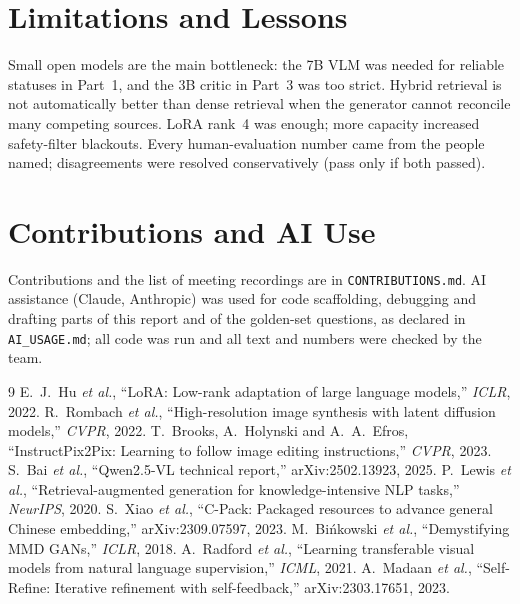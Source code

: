 \documentclass[10pt,twocolumn,letterpaper]{article}
\begin{document}
\section{Limitations and Lessons}
Small open models are the main bottleneck: the 7B VLM was needed for reliable statuses in Part~1, and the 3B critic in
Part~3 was too strict. Hybrid retrieval is not automatically better than dense retrieval when the generator cannot
reconcile many competing sources. LoRA rank~4 was enough; more capacity increased safety-filter blackouts. Every
human-evaluation number came from the people named; disagreements were resolved conservatively (pass only if both
passed).

\pagebreak[2]\section{Contributions and AI Use}
Contributions and the list of meeting recordings are in \texttt{CONTRIBUTIONS.md}. AI assistance (Claude, Anthropic) was
used for code scaffolding, debugging and drafting parts of this report and of the golden-set questions, as declared in
\texttt{AI\_USAGE.md}; all code was run and all text and numbers were checked by the team.

\footnotesize
\begin{thebibliography}{9}
 E.~J.~Hu \emph{et al.}, ``LoRA: Low-rank adaptation of large language models,'' \emph{ICLR}, 2022.
 R.~Rombach \emph{et al.}, ``High-resolution image synthesis with latent diffusion models,'' \emph{CVPR}, 2022.
 T.~Brooks, A.~Holynski and A.~A.~Efros, ``InstructPix2Pix: Learning to follow image editing instructions,'' \emph{CVPR}, 2023.
 S.~Bai \emph{et al.}, ``Qwen2.5-VL technical report,'' arXiv:2502.13923, 2025.
 P.~Lewis \emph{et al.}, ``Retrieval-augmented generation for knowledge-intensive NLP tasks,'' \emph{NeurIPS}, 2020.
 S.~Xiao \emph{et al.}, ``C-Pack: Packaged resources to advance general Chinese embedding,'' arXiv:2309.07597, 2023.
 M.~Bi\'nkowski \emph{et al.}, ``Demystifying MMD GANs,'' \emph{ICLR}, 2018.
 A.~Radford \emph{et al.}, ``Learning transferable visual models from natural language supervision,'' \emph{ICML}, 2021.
 A.~Madaan \emph{et al.}, ``Self-Refine: Iterative refinement with self-feedback,'' arXiv:2303.17651, 2023.
\end{thebibliography}
\end{document}
